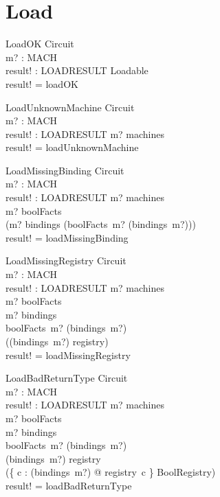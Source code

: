 \documentclass[a4paper,10pt,fleqn]{article}
\begin{document}
\section{Load}

\begin{schema}{LoadOK}
  \Xi Circuit \\
  m? : MACH \\
  result! : LOADRESULT
\where
  Loadable \\
  result! = loadOK
\end{schema}

\begin{schema}{LoadUnknownMachine}
  \Xi Circuit \\
  m? : MACH \\
  result! : LOADRESULT
\where
  m? \notin machines \\
  result! = loadUnknownMachine
\end{schema}

\begin{schema}{LoadMissingBinding}
  \Xi Circuit \\
  m? : MACH \\
  result! : LOADRESULT
\where
  m? \in machines \\
  m? \in \dom boolFacts \\
  (m? \notin \dom bindings \lor \lnot (boolFacts~m? \subseteq \dom (bindings~m?))) \\
  result! = loadMissingBinding
\end{schema}

\begin{schema}{LoadMissingRegistry}
  \Xi Circuit \\
  m? : MACH \\
  result! : LOADRESULT
\where
  m? \in machines \\
  m? \in \dom boolFacts \\
  m? \in \dom bindings \\
  boolFacts~m? \subseteq \dom (bindings~m?) \\
  \lnot (\ran (bindings~m?) \subseteq \dom registry) \\
  result! = loadMissingRegistry
\end{schema}

\begin{schema}{LoadBadReturnType}
  \Xi Circuit \\
  m? : MACH \\
  result! : LOADRESULT
\where
  m? \in machines \\
  m? \in \dom boolFacts \\
  m? \in \dom bindings \\
  boolFacts~m? \subseteq \dom (bindings~m?) \\
  \ran (bindings~m?) \subseteq \dom registry \\
  \lnot (\{ c : \ran (bindings~m?) @ registry~c \} \subseteq BoolRegistry) \\
  result! = loadBadReturnType
\end{schema}
\end{document}
